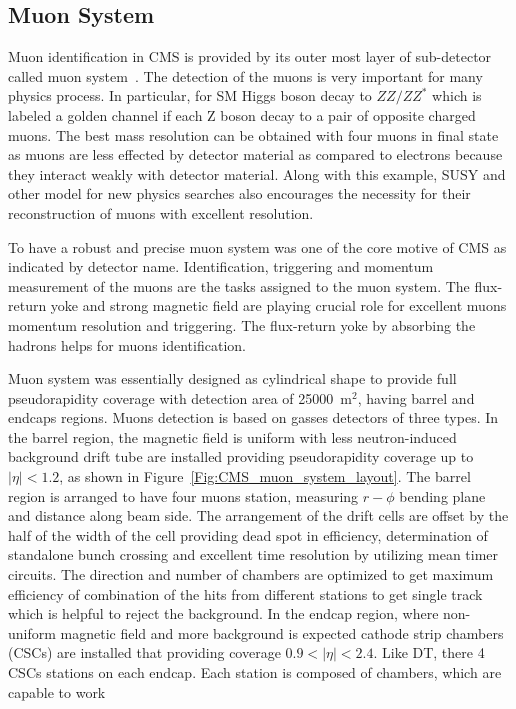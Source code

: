 \subsection{Muon System}
Muon identification in CMS is provided by its outer most layer of sub-detector called muon system~\cite{cms:muonsystem_TDR}. The detection of the muons is very important for many physics
process. In particular, for SM Higgs boson decay to $ZZ/ZZ^{*}$ which is labeled a golden channel if each Z boson decay to a pair of opposite charged muons. The 
best mass resolution can be obtained with four muons in final state as muons are less effected  by detector material as compared to electrons because they 
interact  weakly with detector material. Along with this example, SUSY and other model for new physics searches also encourages the necessity for their
reconstruction of muons with excellent resolution.
\par To have a robust and precise muon system was one of the core motive of CMS as indicated by  detector name. Identification, triggering and momentum
measurement of the muons are the tasks assigned to  the muon system. The flux-return yoke and strong magnetic field are playing crucial role for excellent 
muons momentum resolution and triggering. The flux-return yoke by absorbing the hadrons helps for muons identification.
\par Muon system was essentially designed as cylindrical shape to provide full pseudorapidity coverage with detection area of 25000~m${}^{2}$, having 
barrel and  endcaps regions. Muons detection is  based on gasses detectors of three types. In the barrel region, the magnetic field is uniform with less 
neutron-induced background drift tube are installed providing pseudorapidity coverage up to $|\eta| < 1.2$, as shown in Figure~\ref{Fig:CMS_muon_system_layout}. The barrel region is arranged to have four muons
station, measuring $r-\phi$ bending plane and  distance along beam side. The arrangement of the drift cells are offset by the half of the width of the cell 
providing dead spot in efficiency, determination of standalone bunch crossing and excellent time resolution by utilizing mean timer circuits. The direction
and number of chambers are optimized to get maximum efficiency of combination of the hits from different stations to get single track which is helpful to 
reject the background. In the endcap region, where non-uniform magnetic field and more background is expected cathode strip chambers (CSCs) are installed
that providing coverage $ 0.9 < |\eta| < 2.4$. Like DT, there 4 CSCs stations on each endcap. Each station is composed of chambers, which are capable to work
